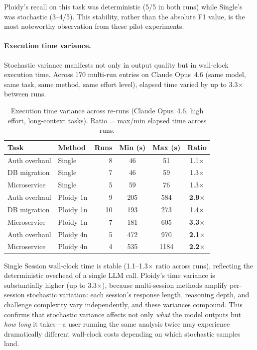 \documentclass[11pt]{article}
\begin{document}
Ploidy's recall on this task was deterministic (5/5 in both runs) while Single's was stochastic (3--4/5). This stability, rather than the absolute F1 value, is the most noteworthy observation from these pilot experiments.

\paragraph{Execution time variance.} Stochastic variance manifests not only in output quality but in wall-clock execution time. Across 170 multi-run entries on Claude Opus~4.6 (same model, same task, same method, same effort level), elapsed time varied by up to 3.3$\times$ between runs.

\begin{table}[H]
\centering
\caption{Execution time variance across re-runs (Claude Opus~4.6, high effort, long-context tasks). Ratio = max/min elapsed time across runs.}
\label{tab:time-variance}
\small
\begin{tabular}{@{}llrccc@{}}
\toprule
\textbf{Task} & \textbf{Method} & \textbf{Runs} & \textbf{Min (s)} & \textbf{Max (s)} & \textbf{Ratio} \\
\midrule
Auth overhaul    & Single    & 8  & 46   & 51   & 1.1$\times$ \\
DB migration     & Single    & 7  & 46   & 59   & 1.3$\times$ \\
Microservice     & Single    & 5  & 59   & 76   & 1.3$\times$ \\
\midrule
Auth overhaul    & Ploidy 1n & 9  & 205  & 584  & \textbf{2.9$\times$} \\
DB migration     & Ploidy 1n & 10 & 193  & 273  & 1.4$\times$ \\
Microservice     & Ploidy 1n & 7  & 181  & 605  & \textbf{3.3$\times$} \\
\midrule
Auth overhaul    & Ploidy 4n & 5  & 472  & 970  & \textbf{2.1$\times$} \\
Microservice     & Ploidy 4n & 4  & 535  & 1184 & \textbf{2.2$\times$} \\
\bottomrule
\end{tabular}
\end{table}

Single Session wall-clock time is stable (1.1--1.3$\times$ ratio across runs), reflecting the deterministic overhead of a single LLM call. Ploidy's time variance is substantially higher (up to 3.3$\times$), because multi-session methods amplify per-session stochastic variation: each session's response length, reasoning depth, and challenge complexity vary independently, and these variances compound. This confirms that stochastic variance affects not only \emph{what} the model outputs but \emph{how long} it takes---a user running the same analysis twice may experience dramatically different wall-clock costs depending on which stochastic samples land.
\end{document}
